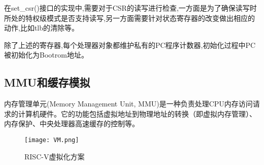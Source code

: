 在set\_csr()接口的实现中,需要对于CSR的读写进行检查,一方面是为了确保读写时所处的特权级模式是否支持读写,另一方面需要针对状态寄存器的改变做出相应的动作,比如tlb的清除等。

除了上述的寄存器,每个处理器对象都维护私有的PC程序计数器,初始化过程中PC被初始化为Bootrom地址。

\subsection{MMU和缓存模拟}

内存管理单元(Memory Management Unit, MMU)是一种负责处理CPU内存访问请求的计算机硬件。它的功能包括虚拟地址到物理地址的转换（即虚拟内存管理）、内存保护、中央处理器高速缓存的控制等。
\begin{figure}[h]
    \centering
    \texttt{[image: VM.png]}
    \caption{RISC-V虚拟化方案}
    \label{fig:VM}
\end{figure}

